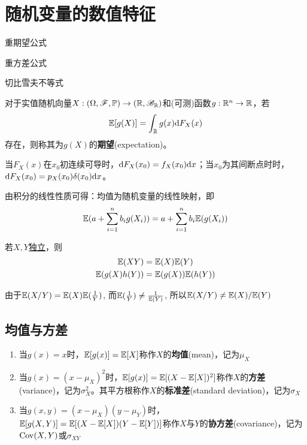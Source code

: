 \chapter{随机变量的数值特征}
\begin{introduction}[考试重点]
    \item 重期望公式
    \item 重方差公式
    \item 切比雪夫不等式
\end{introduction}

\begin{definition}[期望]
    对于实值随机向量$X :(\Omega,\mathscr{F},\mathbb{P}) \to(\mathbb{R},\mathscr{B}_{\mathbb{R}})$和(可测)函数$g : \mathbb{R}^n \to \mathbb{R}$，若
    \[ \mathbb{E}[g(X)] = \int_{\mathbb{R}} g(x) \mathrm{d} F_X(x) \]
    存在，则称其为$g(X)$的\textbf{期望}(expectation)。
\end{definition}

\begin{remark}
    当$F_X(x)$在$x_0$初连续可导时，$\mathrm{d} F_X(x_0)=f_X(x_0)\mathrm{d} x$；当$x_0$为其间断点时时，$\mathrm{d} F_X(x_0)=p_X(x_0)\delta(x_0)\mathrm{d} x$。
\end{remark}


\begin{proposition}[期望的线性性质]
    由积分的线性性质可得：均值为随机变量的线性映射，即
    \[ \mathbb{E}(a+\sum_{i=1}^n b_i g(X_i))=a+\sum_{i=1}^n b_i \mathbb{E}(g(X_i)) \]
\end{proposition}

\begin{proposition}[独立变量的期望]
    若$X,Y$\underline{独立}，则
    \begin{gather*}
        \mathbb{E}(XY)=\mathbb{E}(X)\mathbb{E}(Y) \\
        \mathbb{E}(g(X)h(Y))=\mathbb{E}(g(X))\mathbb{E}(h(Y))
    \end{gather*}
\end{proposition}

\begin{remark}
    由于$\mathbb{E}(X/Y)= \mathbb{E}(X)\mathbb{E}(\frac1{Y})$, 而$\mathbb{E}(\frac1{Y}) \neq \frac1{\mathbb{E}(Y)}$, 所以$\mathbb{E}(X/Y)\neq \mathbb{E}(X)/\mathbb{E}(Y)$
\end{remark}

\section{均值与方差}

\begin{definition}
    \begin{enumerate}
        \item 当$g(x)=x$时，$\mathbb{E}[g(x)]=\mathbb{E}[X]$称作$X$的\textbf{均值}(mean)，记为$\mu_X$
        \item 当$g(x)=(x-\mu_X)^{2}$时，$\mathbb{E}[g(x)]=\mathbb{E}[(X-\mathbb{E}[X])^{2}]$称作$X$的\textbf{方差}(variance)，记为$\sigma^2_X$。其平方根称作$X$的\textbf{标准差}(standard deviation)，记为$\sigma_X$
        \item 当$g(x,y)=(x-\mu_X)(y-\mu_Y)$时，$\mathbb{E}[g(X,Y)]=\mathbb{E}[(X-\mathbb{E}[X])(Y-\mathbb{E}[Y])]$称作$X$与$Y$的\textbf{协方差}(covariance)，记为$\operatorname{Cov}(X,Y)$或$\sigma_{XY}$
    \end{enumerate}
\end{definition}

